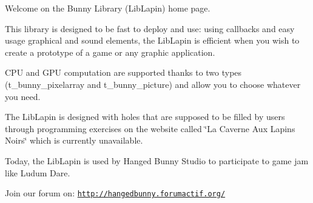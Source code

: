 Welcome on the Bunny Library (Lib\-Lapin) home page.

This library is designed to be fast to deploy and use\-: using callbacks and easy usage graphical and sound elements, the Lib\-Lapin is efficient when you wish to create a prototype of a game or any graphic application.

C\-P\-U and G\-P\-U computation are supported thanks to two types (t\-\_\-bunny\-\_\-pixelarray and t\-\_\-bunny\-\_\-picture) and allow you to choose whatever you need.

The Lib\-Lapin is designed with holes that are supposed to be filled by users through programming exercises on the website called \char`\"{}\-La Caverne Aux Lapins Noirs\char`\"{} which is currently unavailable.

Today, the Lib\-Lapin is used by Hanged Bunny Studio to participate to game jam like Ludum Dare.

Join our forum on\-: \href{http://hangedbunny.forumactif.org/}{\tt http\-://hangedbunny.\-forumactif.\-org/} 